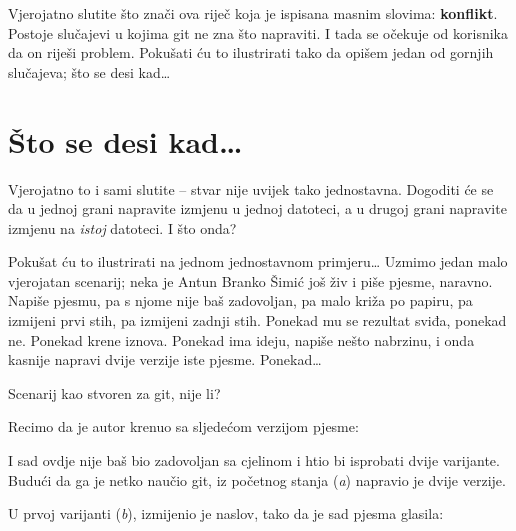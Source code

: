 Vjerojatno slutite što znači ova riječ koja je ispisana masnim slovima: \textbf{konflikt}.
Postoje slučajevi u kojima git ne zna što napraviti. 
I tada se očekuje od korisnika da on riješi problem. 
Pokušati ću to ilustrirati tako da opišem jedan od gornjih slučajeva; što se desi kad\dots

\section*{Što se desi kad\dots}

Vjerojatno to i sami slutite -- stvar nije uvijek tako jednostavna.
Dogoditi će se da u jednoj grani napravite izmjenu u jednoj datoteci, a u drugoj grani napravite izmjenu na \emph{istoj} datoteci.
I što onda?

Pokušat ću to ilustrirati na jednom jednostavnom primjeru\dots
Uzmimo jedan malo vjerojatan scenarij; neka je Antun Branko Šimić još živ i piše pjesme, naravno.
Napiše pjesmu, pa s njome nije baš zadovoljan, pa malo križa po papiru, pa izmijeni prvi stih, pa izmijeni zadnji stih.
Ponekad mu se rezultat sviđa, ponekad ne.
Ponekad krene iznova.
Ponekad ima ideju, napiše nešto nabrzinu, i onda kasnije napravi dvije verzije iste pjesme.
Ponekad\dots

Scenarij kao stvoren za git, nije li?

Recimo da je autor krenuo sa sljedećom verzijom pjesme:


I sad ovdje nije baš bio zadovoljan sa cjelinom i htio bi isprobati dvije varijante.
Budući da ga je netko naučio git, iz početnog stanja (\emph a) napravio je dvije verzije.



U prvoj varijanti (\emph b), izmijenio je naslov, tako da je sad pjesma glasila:


